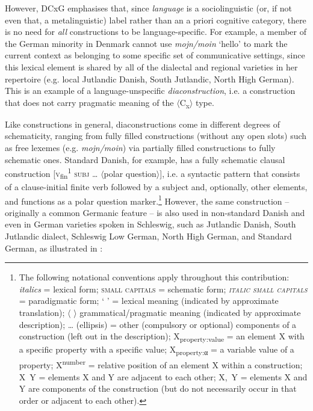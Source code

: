 \documentclass[output=paper]{langsci/langscibook}
\begin{document}
However, DCxG emphasises that, since \textit{language} is a sociolinguistic (or, if not even that, a metalinguistic) label rather than an a priori cognitive category, there is no need for \textit{all} constructions to be language-specific. For example, a member of the German minority in Denmark cannot use \textit{mojn/moin} ‘hello’ to mark the current context as belonging to some specific set of communicative settings, since this lexical element is shared by all of the dialectal and regional varieties in her repertoire (e.g. local Jutlandic Danish, South Jutlandic, North High German). This is an example of a language-unspecific \textit{diaconstruction}, i.e. a construction that does not carry pragmatic meaning of the $\langle$C\textsubscript{x}$\rangle$ type.

Like constructions in general, diaconstructions come in different degrees of schematicity, ranging from fully filled constructions (without any open slots) such as free lexemes (e.g. \textit{mojn/moin}) via partially filled constructions to fully schematic ones. Standard Danish, for example, has a fully schematic clausal construction {[}\textsc{v}\textsubscript{fin}\textsuperscript{1} \textsc{subj} … $\langle$polar question$\rangle${]}, i.e. a syntactic pattern that consists of a clause-initial finite verb followed by a subject and, optionally, other elements, and functions as a polar question marker.\footnote{The following notational conventions apply throughout this contribution:
    \textit{italics} = lexical form;
    \textsc{small capitals} = schematic form;
    \textit{\textsc{italic} \textsc{small} \textsc{capitals}} = paradigmatic form;
    ‘ ’ = lexical meaning (indicated by approximate translation);
    {$\langle$} {$\rangle$} grammatical/pragmatic meaning (indicated by approximate description);
    … (ellipsis) = other (compulsory or optional) components of a construction (left out in the description);
    X\textsubscript{property:value} = an element X with a specific property with a specific value;
    X\textsubscript{property:α} = a variable value of a property;
    X\textsuperscript{number} = relative position of an element X within a construction;
    X~Y = elements X and Y are adjacent to each other;
    X,~Y = elements X and Y are components of the construction (but do not necessarily occur in that order or adjacent to each other).
} However, the same construction – {originally a common Germanic feature –} is also used in non-standard Danish and even in German varieties spoken in Schleswig, such as Jutlandic Danish, South Jutlandic dialect, Schleswig Low German, North High German, and Standard German, as illustrated in :
\end{document}
